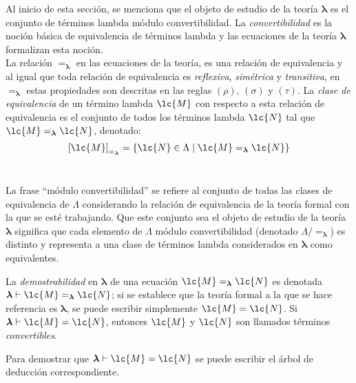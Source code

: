 Al inicio de esta sección, se menciona que el objeto de estudio de la teoría
\(\boldsymbol{\lambda}\) es el conjunto de términos lambda módulo
convertibilidad. La \emph{convertibilidad} es la noción básica de equivalencia
de términos lambda y las ecuaciones de la teoría \(\boldsymbol{\lambda}\)
formalizan esta noción. \\

La relación \(=_{\boldsymbol{\lambda}}\) en las ecuaciones de la teoría, es una
relación de equivalencia y al igual que toda relación de equivalencia es
\emph{reflexiva}, \emph{simétrica} y \emph{transitiva}, en
\(=_{\boldsymbol{\lambda}}\) estas propiedades son descritas en las reglas
\((\rho)\), \((\sigma)\) y \((\tau)\). La \emph{clase de equivalencia} de un
término lambda \(\lc{M}\) con respecto a esta relación de equivalencia es el
conjunto de todos los términos lambda \(\lc{N}\) tal que
\(\lc{M}=_{\boldsymbol{\lambda}}\lc{N}\), denotado: \\

\[\left[ \lc{M} \right]_{=_{\boldsymbol{\lambda}}} = \left\{ \lc{N} \in \Lambda
    \mid \lc{M}=_{\boldsymbol{\lambda}}\lc{N} \right\}\] \

La frase ``módulo convertibilidad'' se refiere al conjunto de todas las clases
de equivalencia de \(\Lambda\) considerando la relación de equivalencia de la
teoría formal con la que se esté trabajando. Que este conjunto sea el objeto de
estudio de la teoría \(\boldsymbol{\lambda}\) significa que cada elemento de
\(\Lambda\) módulo convertibilidad (denotado \(\Lambda /
=_{\boldsymbol{\lambda}}\)) es distinto y representa a una clase de términos
lambda considerados en \(\boldsymbol{\lambda}\) como equivalentes. \\

\begin{defi}[Demostrabilidad] La \emph{demostrabilidad} en
  \(\boldsymbol{\lambda}\) de una ecuación
  \(\lc{M}=_{\boldsymbol{\lambda}}\lc{N}\) es denotada \(\boldsymbol{\lambda}
  \vdash \lc{M}=_{\boldsymbol{\lambda}}\lc{N}\); si se establece que la teoría
  formal a la que se hace referencia es \(\boldsymbol{\lambda}\), se puede
  escribir simplemente \(\lc{M}=\lc{N}\). Si \(\boldsymbol{\lambda} \vdash
  \lc{M}=\lc{N}\), entonces \(\lc{M}\) y \(\lc{N}\) son llamados términos
  \emph{convertibles}.
  \label{definicion:demostrabilidad}
\end{defi}

Para demostrar que \(\boldsymbol{\lambda} \vdash \lc{M}=\lc{N}\) se puede
escribir el árbol de deducción correspondiente.

